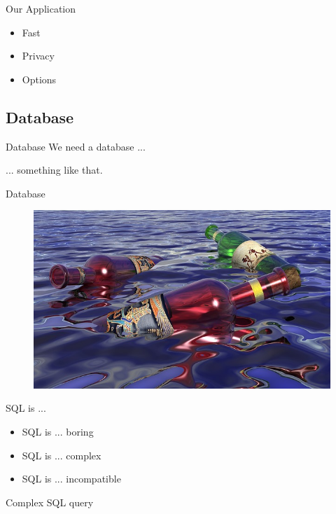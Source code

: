 \begin{frame}{Our Application}
\begin{itemize}
\item Fast
\item Privacy
\item Options
\end{itemize}
\end{frame}

\subsection{Database}
\begin{frame}{Database}
\centering
We need a database ...
\end{frame}

... something like that.

\begin{frame}{Database}
\begin{figure}[!ht]
\centering
\includegraphics[width=1\linewidth]{img/bottles.jpg}
\end{figure}
\end{frame}

\begin{frame}{SQL is ...}
\begin{itemize}
\item SQL is ... boring
\item SQL is ... complex
\item SQL is ... incompatible
\end{itemize}
\end{frame}

\begin{frame}{Complex SQL query}
\end{frame}

